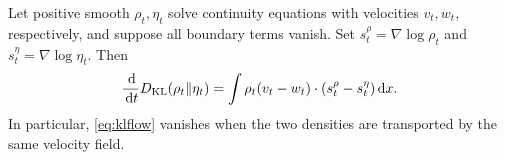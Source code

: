 \documentclass[12pt,a4paper,oneside]{book}
\begin{document}
\begin{proposition}
\label{prop:kltransport}
\label{src:p9q12}

Let positive smooth $\rho_t,\eta_t$ solve continuity equations with velocities $v_t,w_t$, respectively, and suppose all
boundary terms vanish. Set $s_t^\rho=\nabla\log\rho_t$ and $s_t^\eta=\nabla\log\eta_t$. Then
\begin{equation}
    \frac{\,\mathrm{d}}{\,\mathrm{d} t}D_{\mathrm{KL}}(\rho_t\Vert\eta_t)
    = \int\rho_t(v_t-w_t)\cdot(s_t^\rho-s_t^\eta)\,\mathrm{d} x.
    \label{eq:klflow}
\end{equation}
In particular, \eqref{eq:klflow} vanishes when the two densities are transported by the same velocity field.
\end{proposition}
\end{document}
